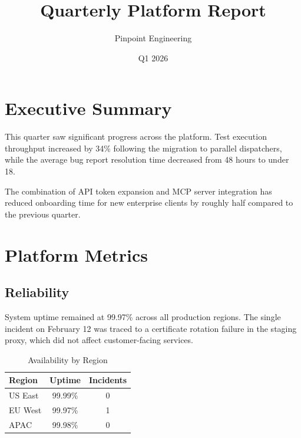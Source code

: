 \documentclass[11pt]{article}
\title{Quarterly Platform Report}
\author{Pinpoint Engineering}
\date{Q1 2026}
\begin{document}

{
    \hypersetup{linkcolor=PinTextMuted}
    \tableofcontents
}
\newpage

\section{Executive Summary}

This quarter saw significant progress across the platform. Test execution throughput increased by 34\% following the migration to parallel dispatchers, while the average bug report resolution time decreased from 48 hours to under 18.

\begin{keyinsight}
The combination of API token expansion and MCP server integration has reduced onboarding time for new enterprise clients by roughly half compared to the previous quarter.
\end{keyinsight}

\section{Platform Metrics}

\subsection{Reliability}

System uptime remained at 99.97\% across all production regions. The single incident on February 12 was traced to a certificate rotation failure in the staging proxy, which did not affect customer-facing services.

\begin{table}[ht]
    \centering
    \caption{Availability by Region}
    \begin{tabular}{lcc}
        \toprule
        \textcolor{PinTextBright}{\textbf{Region}} &
        \textcolor{PinTextBright}{\textbf{Uptime}} &
        \textcolor{PinTextBright}{\textbf{Incidents}} \\
        \midrule
        US East     & 99.99\% & 0 \\
        EU West     & 99.97\% & 1 \\
        APAC        & 99.98\% & 0 \\
        \bottomrule
    \end{tabular}
\end{table}
\end{document}
